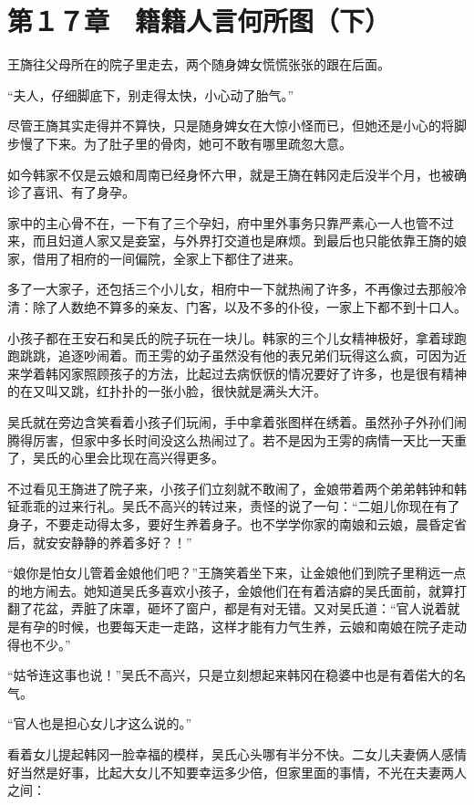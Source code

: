 \section{第１７章　籍籍人言何所图（下）}

王旖往父母所在的院子里走去，两个随身婢女慌慌张张的跟在后面。

“夫人，仔细脚底下，别走得太快，小心动了胎气。”

尽管王旖其实走得并不算快，只是随身婢女在大惊小怪而已，但她还是小心的将脚步慢了下来。为了肚子里的骨肉，她可不敢有哪里疏忽大意。

如今韩家不仅是云娘和周南已经身怀六甲，就是王旖在韩冈走后没半个月，也被确诊了喜讯、有了身孕。

家中的主心骨不在，一下有了三个孕妇，府中里外事务只靠严素心一人也管不过来，而且妇道人家又是妾室，与外界打交道也是麻烦。到最后也只能依靠王旖的娘家，借用了相府的一间偏院，全家上下都住了进来。

多了一大家子，还包括三个小儿女，相府中一下就热闹了许多，不再像过去那般冷清：除了人数绝不算多的亲友、门客，以及不多的仆役，一家上下都不到十口人。

小孩子都在王安石和吴氏的院子玩在一块儿。韩家的三个儿女精神极好，拿着球跑跑跳跳，追逐吵闹着。而王雱的幼子虽然没有他的表兄弟们玩得这么疯，可因为近来学着韩冈家照顾孩子的方法，比起过去病恹恹的情况要好了许多，也是很有精神的在又叫又跳，红扑扑的一张小脸，很快就是满头大汗。

吴氏就在旁边含笑看着小孩子们玩闹，手中拿着张图样在绣着。虽然孙子外孙们闹腾得厉害，但家中多长时间没这么热闹过了。若不是因为王雱的病情一天比一天重了，吴氏的心里会比现在高兴得更多。

不过看见王旖进了院子来，小孩子们立刻就不敢闹了，金娘带着两个弟弟韩钟和韩钲乖乖的过来行礼。吴氏不高兴的转过来，责怪的说了一句：“二姐儿你现在有了身子，不要走动得太多，要好生养着身子。也不学学你家的南娘和云娘，晨昏定省后，就安安静静的养着多好？！”

“娘你是怕女儿管着金娘他们吧？”王旖笑着坐下来，让金娘他们到院子里稍远一点的地方闹去。她知道吴氏多喜欢小孩子，金娘他们在有着洁癖的吴氏面前，就算打翻了花盆，弄脏了床罩，砸坏了窗户，都是有对无错。又对吴氏道：“官人说着就是有孕的时候，也要每天走一走路，这样才能有力气生养，云娘和南娘在院子走动得也不少。”

“姑爷连这事也说！”吴氏不高兴，只是立刻想起来韩冈在稳婆中也是有着偌大的名气。

“官人也是担心女儿才这么说的。”

看着女儿提起韩冈一脸幸福的模样，吴氏心头哪有半分不快。二女儿夫妻俩人感情好当然是好事，比起大女儿不知要幸运多少倍，但家里面的事情，不光在夫妻两人之间：

